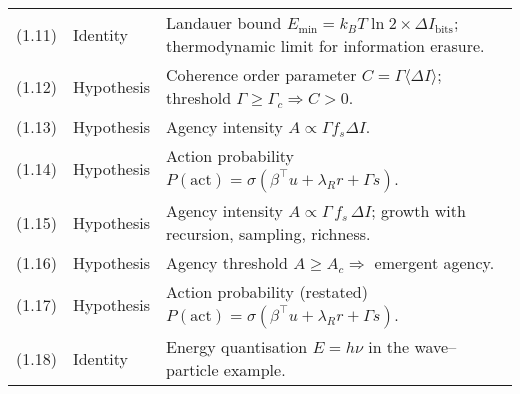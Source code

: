 \begin{longtable}{@{}p{2.2cm}p{2.7cm}p{9.5cm}@{}}
(1.11) & Identity &
Landauer bound $E_{\min}=k_B T\ln 2\times \Delta I_{\text{bits}}$; thermodynamic limit for information erasure. \\[4pt]

(1.12) & Hypothesis &
Coherence order parameter $C=\Gamma\langle\Delta I\rangle$; threshold $\Gamma\ge \Gamma_c \Rightarrow C>0$. \\[4pt]

(1.13) & Hypothesis &
Agency intensity $A\propto \Gamma f_s \Delta I$. \\[4pt]

(1.14) & Hypothesis &
Action probability $P(\mathrm{act})=\sigma(\beta^{\top}u + \lambda_R r + \Gamma s)$. \\[4pt]

(1.15) & Hypothesis &
Agency intensity $A \propto \Gamma\,f_s\,\Delta I$; growth with recursion, sampling, richness. \\[4pt]

(1.16) & Hypothesis &
Agency threshold $A \ge A_c \Rightarrow$ emergent agency. \\[4pt]

(1.17) & Hypothesis &
Action probability (restated) $P(\mathrm{act})=\sigma(\beta^{\top}u + \lambda_R r + \Gamma s)$. \\[4pt]

(1.18) & Identity &
Energy quantisation $E=h\nu$ in the wave–particle example. \\[4pt]


\end{longtable}


\clearpage
